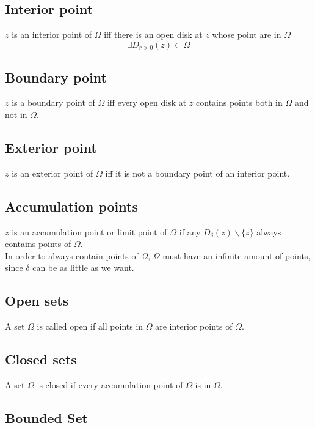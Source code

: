 \documentclass{article}
\begin{document}
\subsection{Interior point}

\(z\) is an interior point of \(\Omega\) iff there is an open disk
at \(z\) whose point are in \(\Omega\)
\[
    \exists D_{r>0}(z) \subset \Omega
\]

\subsection{Boundary point}

\(z\) is a boundary point of \(\Omega\) iff every open disk at \(z\)
contains points both in \(\Omega\) and not in \(\Omega\).

\subsection{Exterior point}

\(z\) is an exterior point of \(\Omega\) iff it is not a boundary
point of an interior point.

\subsection{Accumulation points}

\(z\) is an accumulation point or limit point of \(\Omega\) if any
\(D_\delta(z)\backslash \{z\}\) always contains points of \(\Omega\).
\\
In order to always contain points of \(\Omega\), \(\Omega\) must have an
infinite amount of points, since \(\delta\) can be as little as we want.

\subsection{Open sets}

A set \(\Omega\) is called open if all points in \(\Omega\)
are interior points of \(\Omega\).

\subsection{Closed sets}

A set \(\Omega\) is closed if every accumulation point of \(\Omega\)
is in \(\Omega\). 

\subsection{Bounded Set}
\end{document}
